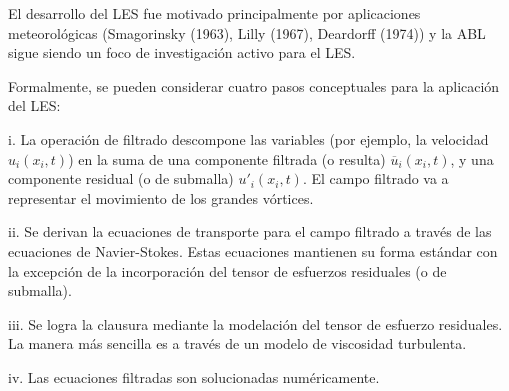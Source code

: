 El desarrollo del LES fue motivado principalmente por aplicaciones meteorológicas (Smagorinsky (1963), Lilly (1967), Deardorff (1974)) y la ABL sigue siendo un foco de investigación activo para el LES. 

Formalmente, se pueden considerar cuatro pasos conceptuales para la aplicación del LES:
\begin{enumerate*}
	\item[i.] La operación de filtrado descompone las variables (por ejemplo, la velocidad $u_i(x_i,t)$) en la suma de una componente filtrada (o resulta) $\overline{u}_i(x_i,t)$, y una componente residual (o de submalla) $u'_i(x_i,t)$. El campo filtrado va a representar el movimiento de los grandes vórtices.
	\item[ii.] Se derivan la ecuaciones de transporte para el campo filtrado a través de las ecuaciones de Navier-Stokes. Estas ecuaciones mantienen su forma estándar con la excepción de la incorporación del tensor de esfuerzos residuales (o de submalla).
	\item[iii.] Se logra la clausura mediante la modelación del tensor de esfuerzo residuales. La manera más sencilla es a través de un modelo de viscosidad turbulenta.
	\item[iv.] Las ecuaciones filtradas son solucionadas numéricamente.
\end{enumerate*}
